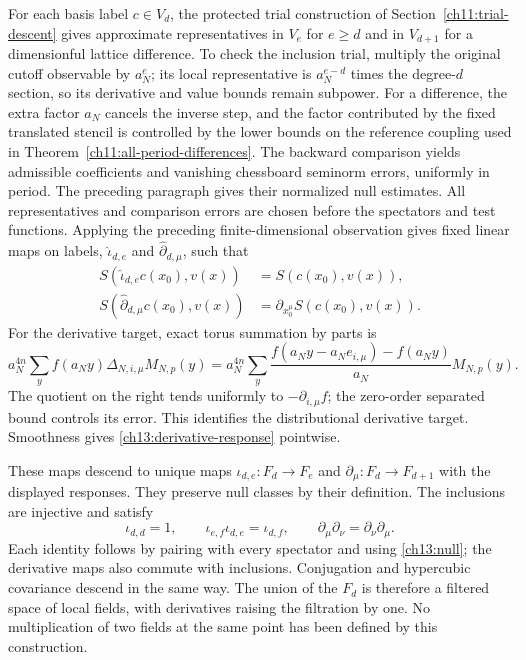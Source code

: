 For each basis label $c\in V_d$, the protected trial construction
of Section~\ref{ch11:trial-descent} gives approximate representatives
in $V_e$ for $e\ge d$ and in $V_{d+1}$ for a dimensionful lattice
difference. To check the inclusion trial, multiply the original
cutoff observable by $a_N^e$; its local representative is
$a_N^{e-d}$ times the degree-$d$ section, so its derivative and
value bounds remain subpower. For a difference, the extra factor
$a_N$ cancels the inverse step, and the factor contributed by the fixed translated stencil
is controlled by the lower bounds on the reference coupling used in
Theorem~\ref{ch11:all-period-differences}.
The backward comparison yields admissible coefficients and vanishing chessboard seminorm errors, uniformly in period. The preceding paragraph gives
their normalized null estimates.
All representatives and comparison errors are chosen before
the spectators and test functions.
Applying the preceding
finite-dimensional observation gives fixed linear maps on labels,
$\widehat\iota_{d,e}$ and $\widehat\partial_{d,\mu}$, such that
\begin{align}
 S(\widehat\iota_{d,e}c(x_0),v(x))&=S(c(x_0),v(x)),\label{ch13:inclusion-response}\\
 S(\widehat\partial_{d,\mu}c(x_0),v(x))
                      &=\partial_{x_0^\mu}S(c(x_0),v(x)).
 \label{ch13:derivative-response}
\end{align}
For the derivative target, exact torus summation by parts is
\[
 a_N^{4n}\sum_y f(a_Ny)\Delta_{N,i,\mu}M_{N,p}(y)
 =a_N^{4n}\sum_y
 \frac{f(a_Ny-a_Ne_{i,\mu})-f(a_Ny)}{a_N}M_{N,p}(y).
\]
The quotient on the right tends uniformly to $-\partial_{i,\mu}f$;
the zero-order separated bound controls its error. This identifies
the distributional derivative target. Smoothness gives
\eqref{ch13:derivative-response} pointwise.

These maps descend to unique maps
$\iota_{d,e}:F_d\to F_e$ and $\partial_\mu:F_d\to F_{d+1}$
with the displayed responses. They preserve null classes by their
definition. The inclusions are injective and satisfy
\[
 \iota_{d,d}=1,\qquad
 \iota_{e,f}\iota_{d,e}=\iota_{d,f},\qquad
 \partial_\mu\partial_\nu=\partial_\nu\partial_\mu.
\]
Each identity follows by pairing with every spectator and using
\eqref{ch13:null}; the derivative maps also commute with inclusions.
Conjugation and hypercubic covariance descend in the same way.
The union of the $F_d$ is therefore a filtered space of local fields,
with derivatives raising the filtration by one. No multiplication of
two fields at the same point has been defined by this construction.

